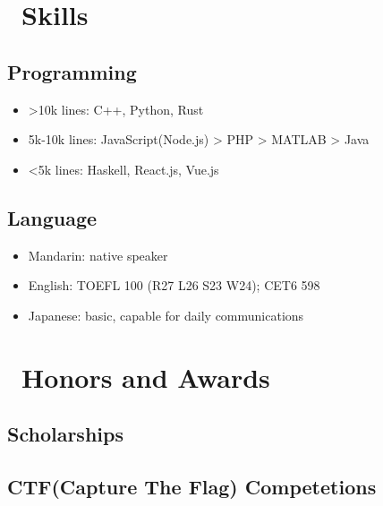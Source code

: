 \documentclass{resume}
\begin{document}
\section{\faCogs\ Skills}
\subsection{Programming}
\begin{itemize}[parsep=0.5ex]
  \item >10k lines: C++, Python, Rust
  \item 5k-10k lines: JavaScript(Node.js) > PHP > MATLAB > Java
  \item <5k lines: Haskell, React.js, Vue.js
\end{itemize}
\subsection{Language}
\begin{itemize}[parsep=0.5ex]
  \item Mandarin: native speaker
  \item English: TOEFL 100 (R27 L26 S23 W24); CET6 598
  \item Japanese: basic, capable for daily communications
\end{itemize}

\section{\faHeartO\ Honors and Awards}
\subsection{Scholarships}

\subsection{CTF(Capture The Flag) Competetions}
\end{document}
